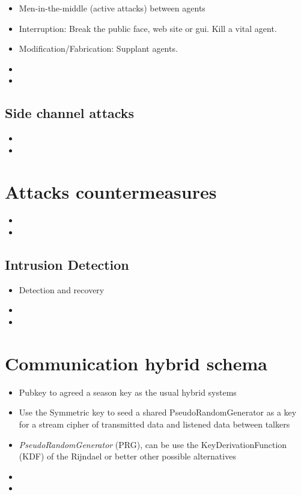 \documentclass[10pt,a4paper,twoside]{llncs}
\begin{document}
\begin{itemize}
 \item Men-in-the-middle (active attacks) between agents
 \item Interruption: Break the public face, web site or gui. Kill a vital agent.
 \item Modification/Fabrication: Supplant agents.
 \item 
 \item 
\end{itemize}

%
\subsection{Side channel attacks}

\begin{itemize}
 \item
 \item 
\end{itemize}

%
\section{Attacks countermeasures}

\begin{itemize}
 \item
 \item 
\end{itemize}

%
\subsection{Intrusion Detection}

\begin{itemize}
 \item Detection and recovery
 \item 
 \item 
\end{itemize}

%
\section{Communication hybrid schema \label{sec:intercom}}

\begin{itemize}
 \item Pubkey to agreed a season key as the usual hybrid systems
 \item Use the Symmetric key to seed a shared PseudoRandomGenerator as a key for a stream cipher of transmitted data and listened data between talkers
 \item \emph{PseudoRandomGenerator} (PRG), can be use the KeyDerivationFunction (KDF) of the Rijndael or better other possible alternatives
 \item 
 \item 
\end{itemize}
\end{document}
